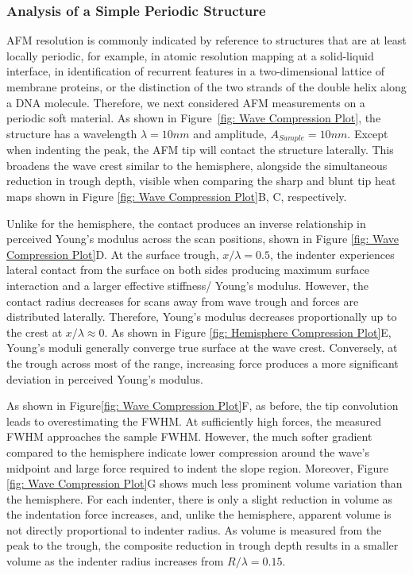 \subsubsection{Analysis of a Simple Periodic Structure}
AFM resolution is commonly indicated by reference to structures that are at least locally periodic, for example, in atomic resolution mapping at a solid-liquid interface\cite{fukuma2018atomic}, in identification of recurrent features in a two-dimensional lattice of membrane proteins\cite{bippes2011high, li2006probing}, or the distinction of the two strands of the double helix along a DNA molecule\cite{pyne2014single}. Therefore, we next considered AFM measurements on a periodic soft material. As shown in  Figure~\ref{fig: Wave Compression Plot}, the structure has a wavelength $\lambda = 10nm$ and amplitude, $A_{Sample} = 10nm $. Except when indenting the peak, the AFM tip will contact the structure laterally. This broadens the wave crest similar to the hemisphere, alongside the simultaneous reduction in trough depth, visible when comparing the sharp and blunt tip heat maps shown in Figure \ref{fig: Wave Compression Plot}B, C, respectively. 


Unlike for the hemisphere, the contact produces an inverse relationship in perceived Young's modulus across the scan positions, shown in Figure \ref{fig: Wave Compression Plot}D. At the surface trough, $x/\lambda = 0.5$, the indenter experiences lateral contact from the surface on both sides producing maximum surface interaction and a larger effective stiffness/ Young's modulus. However, the contact radius decreases for scans away from wave trough and forces are distributed laterally. Therefore, Young's modulus decreases proportionally up to the crest at $x/\lambda \approx 0$. As shown in Figure \ref{fig: Hemisphere Compression Plot}E, Young's moduli generally converge true surface at the wave crest. Conversely, at the trough across most of the range, increasing force produces a more significant deviation in perceived Young's modulus.

As shown in Figure\ref{fig: Wave Compression Plot}F, as before, the tip convolution leads to overestimating the FWHM. At sufficiently high forces, the measured FWHM approaches the sample FWHM. However, the much softer gradient compared to the hemisphere indicate lower compression around the wave's midpoint and large force required to indent the slope region. Moreover, Figure \ref{fig: Wave Compression Plot}G shows much less prominent volume variation than the hemisphere. For each indenter, there is only a slight reduction in volume as the indentation force increases, and, unlike the hemisphere, apparent volume is not directly proportional to indenter radius. As volume is measured from the peak to the trough, the composite reduction in trough depth results in a smaller volume as the indenter radius increases from $R/\lambda =0.15$. 

